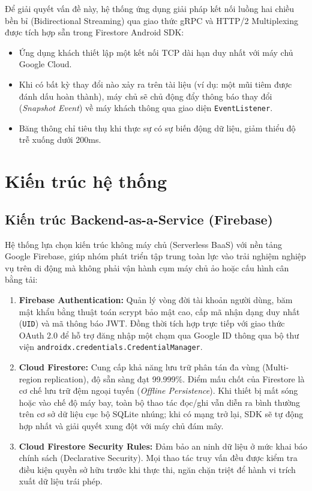 Để giải quyết vấn đề này, hệ thống ứng dụng giải pháp kết nối luồng hai chiều bền bỉ (Bidirectional Streaming) qua giao thức gRPC và HTTP/2 Multiplexing được tích hợp sẵn trong Firestore Android SDK:
\begin{itemize}
    \item Ứng dụng khách thiết lập một kết nối TCP dài hạn duy nhất với máy chủ Google Cloud.
    \item Khi có bất kỳ thay đổi nào xảy ra trên tài liệu (ví dụ: một mũi tiêm được đánh dấu hoàn thành), máy chủ sẽ chủ động đẩy thông báo thay đổi (\textit{Snapshot Event}) về máy khách thông qua giao diện \texttt{EventListener}.
    \item Băng thông chỉ tiêu thụ khi thực sự có sự biến động dữ liệu, giảm thiểu độ trễ xuống dưới 200ms.
\end{itemize}

\section{Kiến trúc hệ thống}
\label{sec:kien_truc_he_thong}

\subsection{Kiến trúc Backend-as-a-Service (Firebase)}
\label{subsec:kien_truc_backend}

Hệ thống lựa chọn kiến trúc không máy chủ (Serverless BaaS) với nền tảng Google Firebase, giúp nhóm phát triển tập trung toàn lực vào trải nghiệm nghiệp vụ trên di động mà không phải vận hành cụm máy chủ ảo hoặc cấu hình cân bằng tải:

\begin{enumerate}
    \item \textbf{Firebase Authentication:} Quản lý vòng đời tài khoản người dùng, băm mật khẩu bằng thuật toán scrypt bảo mật cao, cấp mã nhận dạng duy nhất (\texttt{UID}) và mã thông báo JWT. Đồng thời tích hợp trực tiếp với giao thức OAuth 2.0 để hỗ trợ đăng nhập một chạm qua Google ID thông qua bộ thư viện \texttt{androidx.credentials.CredentialManager}.
    \item \textbf{Cloud Firestore:} Cung cấp khả năng lưu trữ phân tán đa vùng (Multi-region replication), độ sẵn sàng đạt 99.999\%. Điểm mấu chốt của Firestore là cơ chế lưu trữ đệm ngoại tuyến (\textit{Offline Persistence}). Khi thiết bị mất sóng hoặc vào chế độ máy bay, toàn bộ thao tác đọc/ghi vẫn diễn ra bình thường trên cơ sở dữ liệu cục bộ SQLite nhúng; khi có mạng trở lại, SDK sẽ tự động hợp nhất và giải quyết xung đột với máy chủ đám mây.
    \item \textbf{Cloud Firestore Security Rules:} Đảm bảo an ninh dữ liệu ở mức khai báo chính sách (Declarative Security). Mọi thao tác truy vấn đều được kiểm tra điều kiện quyền sở hữu trước khi thực thi, ngăn chặn triệt để hành vi trích xuất dữ liệu trái phép.
\end{enumerate}

